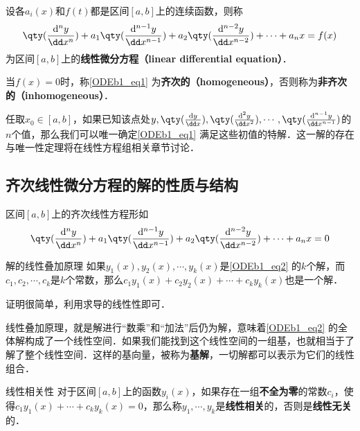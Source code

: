 
\begin{definition}{}
设各$a_i(x)$和$f(t)$都是区间$[a, b]$上的连续函数，则称
\begin{equation}\label{ODEb1_eq1}
\qty(\frac{\mathrm{d}^n y}{\dd x^n})+a_1\qty(\frac{\mathrm{d}^{n-1} y}{\dd x^{n-1}})+a_2\qty(\frac{\mathrm{d}^{n-2} y}{\dd x^{n-2}})+\cdots+a_nx=f(x)
\end{equation}
为区间$[a, b]$上的\textbf{线性微分方程（linear differential equation）}．

当$f(x)=0$时，称\autoref{ODEb1_eq1} 为\textbf{齐次的（homogeneous）}，否则称为\textbf{非齐次的（inhomogeneous）}．
\end{definition}

任取$x_0\in[a, b]$，如果已知该点处$y, \qty(\frac{\mathrm{d} y}{\dd x}), \qty(\frac{\mathrm{d}^{2} y}{\dd x^{2}}), \cdots, \qty(\frac{\mathrm{d}^{n-1} y}{\dd x^{n-1}})$的$n$个值，那么我们可以唯一确定\autoref{ODEb1_eq1} 满足这些初值的特解．这一解的存在与唯一性定理将在线性方程组相关章节讨论．


\subsection{齐次线性微分方程的解的性质与结构}

区间$[a, b]$上的齐次线性方程形如
\begin{equation}\label{ODEb1_eq2}
\qty(\frac{\mathrm{d}^n y}{\dd x^n})+a_1\qty(\frac{\mathrm{d}^{n-1} y}{\dd x^{n-1}})+a_2\qty(\frac{\mathrm{d}^{n-2} y}{\dd x^{n-2}})+\cdots+a_nx=0
\end{equation}

\begin{theorem}{解的线性叠加原理}
如果$y_1(x), y_2(x), \cdots, y_k(x)$是\autoref{ODEb1_eq2} 的$k$个解，而$c_1, c_2, \cdots, c_k$是$k$个常数，那么$c_1y_1(x)+c_2y_2(x)+\cdots+c_ky_k(x)$也是一个解．
\end{theorem}

证明很简单，利用求导的线性性即可．

线性叠加原理，就是解进行“数乘”和“加法”后仍为解，意味着\autoref{ODEb1_eq2} 的全体解构成了一个线性空间．如果我们能找到这个线性空间的一组基，也就相当于了解了整个线性空间．这样的基向量，被称为\textbf{基解}，一切解都可以表示为它们的线性组合．

\begin{definition}{线性相关性}
对于区间$[a, b]$上的函数$y_i(x)$，如果存在一组\textbf{不全为零}的常数$c_i$，使得$c_1y_1(x)+\cdots+c_ky_k(x)=0$，那么称$y_1, \cdots, y_k$是\textbf{线性相关}的，否则是\textbf{线性无关}的．
\end{definition}

